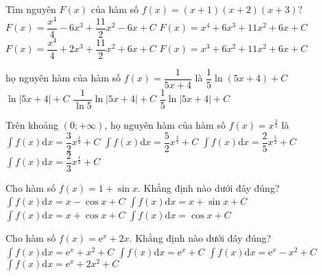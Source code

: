 \begin{ex}
	Tìm nguyên $F(x)$ của hàm số $f(x)=\left(x+1\right)\left(x+2\right)\left(x+3\right)?$ 
	\choice
	{$F(x)=\dfrac{x^4}{4}-6x^3+\dfrac{11}{2}{x^2}-6x+C$}
	{$F(x)=x^4+6x^3+11x^2+6x+C$}
	{\True $F(x)=\dfrac{x^4}{4}+2x^3+\dfrac{11}{2}{x^2}+6x+C$}
	{$F(x)=x^3+6x^2+11x^2+6x+C$}
\end{ex}
\begin{ex}
	họ nguyên hàm của hàm số $ f(x)=\dfrac{1}{5x+4}$ là
	\choice
	{$\dfrac{1}{5}\ln\left(5x+4\right)+C$}
	{$\ln\left| 5x+4\right|+C$}
	{$\dfrac{1}{\ln 5}\ln\left| 5x+4\right|+C$}
	{\True $\dfrac{1}{5}\ln\left| 5x+4\right|+C$}
\end{ex}
\begin{ex}
	Trên khoảng $\left(0;+\infty\right)$, họ nguyên hàm của hàm số $f(x)=x^{\frac{3}{2}}$ là
	\choice
	{$\displaystyle\int{f(x)\mathrm{d}x=\dfrac{3}{2}{x^{\frac{1}{2}}}}+C$}
	{$\displaystyle\int{f(x)\mathrm{d}x=\dfrac{5}{2}{x^{\frac{2}{5}}}}+C$}
	{\True $\displaystyle\int{f(x)\mathrm{d}x=\dfrac{2}{5}{x^{\frac{5}{2}}}}+C$}
	{$\displaystyle\int{f(x)\mathrm{d}x=\dfrac{2}{3}{x^{\frac{1}{2}}}}+C$}
\end{ex}
\begin{ex}
	Cho hàm số $ f(x)=1+\sin x$. Khẳng định nào dưới đây đúng?
	\choice
	{\True $\displaystyle\int{f(x)\mathrm{d}x}=x-\cos x+C$} {$\displaystyle\int{f(x)\mathrm{d}x}=x+\sin x+C$} {$\displaystyle\int{f(x)\mathrm{d}x}=x+\cos x+C$} {$\displaystyle\int{f(x)\mathrm{d}x}=\cos x+C$}
\end{ex}
\begin{ex}
	[Mã 101 - 2022]%
	Cho hàm số $ f(x)=\mathrm{e}^x+2x.$ Khẳng định nào dưới đây đúng?
	\choice
	{\True $\displaystyle\int{f(x)}\mathrm{d}x=\mathrm{e}^x+x^2+C$}
	{$\displaystyle\int{f(x)}\mathrm{d}x=\mathrm{e}^x+C$}
	{$\displaystyle\int{f(x)}\mathrm{d}x=\mathrm{e}^x-x^2+C$}
	{$\displaystyle\int{f(x)}\mathrm{d}x=\mathrm{e}^x+2x^2+C$}
\end{ex}
